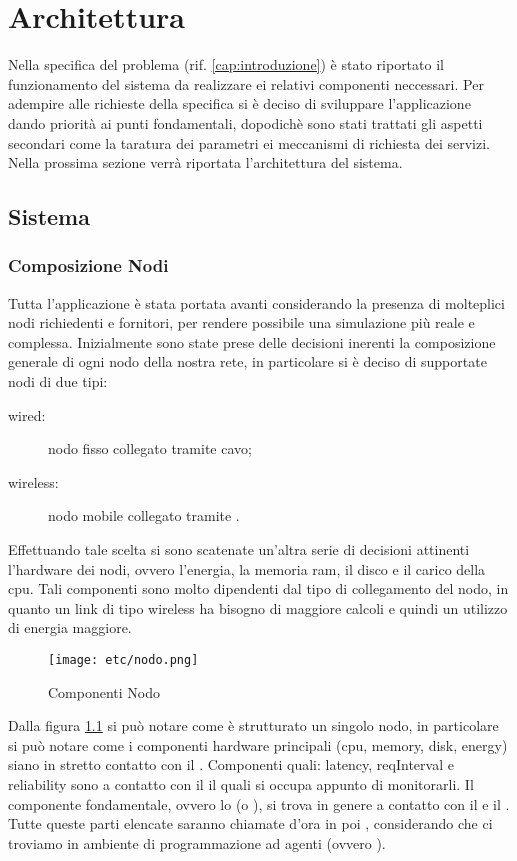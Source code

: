 \chapter{Architettura}\label{cap:architettura}
Nella specifica del problema (rif. \ref{cap:introduzione}) è stato riportato il funzionamento del sistema da realizzare ei relativi componenti neccessari. Per adempire alle richieste della specifica si è deciso di sviluppare l'applicazione dando priorità ai punti fondamentali, dopodichè sono stati trattati gli aspetti secondari come la taratura dei parametri ei meccanismi di richiesta dei servizi. Nella prossima sezione verrà riportata l'architettura del sistema.
\section{Sistema}
\subsection{Composizione Nodi}
Tutta l'applicazione è stata portata avanti considerando la presenza di molteplici nodi richiedenti e fornitori, per rendere possibile una simulazione più reale e complessa. Inizialmente sono state prese delle decisioni inerenti la composizione generale di ogni nodo della nostra rete, in particolare si è deciso di supportate nodi di due tipi:
\begin{description}
\item[wired:] nodo fisso collegato tramite cavo;
\item[wireless:] nodo mobile collegato tramite .
\end{description}
Effettuando tale scelta si sono scatenate un'altra serie di decisioni attinenti l'hardware dei nodi, ovvero l'energia, la memoria ram, il disco e il carico della cpu. Tali componenti sono molto dipendenti dal tipo di collegamento del nodo, in quanto un link di tipo wireless ha bisogno di maggiore calcoli e quindi un utilizzo di energia maggiore.
\begin{figure}[H]
\begin{center}
\texttt{[image: etc/nodo.png]}
\caption{Componenti Nodo}
\label{componentinodo}
\end{center}
\end{figure}
Dalla figura \ref{componentinodo} si può notare come è strutturato un singolo nodo, in particolare si può notare come i componenti hardware principali (cpu, memory, disk, energy) siano in stretto contatto con il . Componenti quali: latency, reqInterval e reliability sono a contatto con il  il quali si occupa appunto di monitorarli. Il componente fondamentale, ovvero lo  (o ), si trova in genere a contatto con il  e il . Tutte queste parti elencate saranno chiamate d'ora in poi , considerando che ci troviamo in ambiente di programmazione ad agenti (ovvero ).
